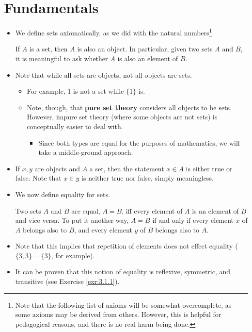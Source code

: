 \documentclass[../main.tex]{subfiles}
\begin{document}
\section{Fundamentals}
\begin{itemize}
    \item We define sets axiomatically, as we did with the natural numbers\footnote{Note that the following list of axioms will be somewhat overcomplete, as some axioms may be derived from others. However, this is helpful for pedagogical reasons, and there is no real harm being done.}.
    \begin{axm}\label{axm:setsAreObjects}
        If $A$ is a set, then $A$ is also an object. In particular, given two sets $A$ and $B$, it is meaningful to ask whether $A$ is also an element of $B$.
    \end{axm}
    \item Note that while all sets are objects, not all objects are sets.
    \begin{itemize}
        \item For example, $1$ is not a set while $\{1\}$ is.
        \item Note, though, that \textbf{pure set theory} considers all objects to be sets. However, impure set theory (where some objects are not sets) is conceptually easier to deal with.
        \begin{itemize}
            \item Since both types are equal for the purposes of mathematics, we will take a middle-ground approach.
        \end{itemize}
    \end{itemize}
    \item If $x,y$ are objects and $A$ a set, then the statement $x\in A$ is either true or false. Note that $x\in y$ is neither true nor false, simply meaningless.
    \item We now define equality for sets.
    \begin{dfn}\label{dfn:setEquality}
        Two sets $A$ and $B$ are equal, $A=B$, iff every element of $A$ is an element of $B$ and vice versa. To put it another way, $A=B$ if and only if every element $x$ of $A$ belongs also to $B$, and every element $y$ of $B$ belongs also to $A$.
    \end{dfn}
    \item Note that this implies that repetition of elements does not effect equality ($\{3,3\}=\{3\}$, for example).
    \item It can be proven that this notion of equality is reflexive, symmetric, and transitive (see Exercise \ref{exr:3.1.1}).

\end{itemize}
\end{document}
